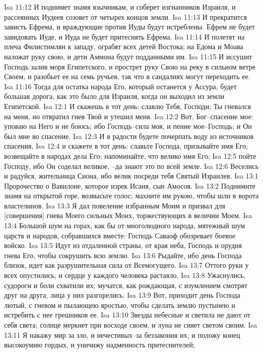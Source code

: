 Isa 11:12  И поднимет знамя язычникам, и соберет изгнанников Израиля, и рассеянных Иудеев созовет от четырех концов земли.
Isa 11:13  И прекратится зависть Ефрема, и враждующие против Иуды будут истреблены. Ефрем не будет завидовать Иуде, и Иуда не будет притеснять Ефрема.
Isa 11:14  И полетят на плеча Филистимлян к западу, ограбят всех детей Востока; на Едома и Моава наложат руку свою, и дети Аммона будут подданными им.
Isa 11:15  И иссушит Господь залив моря Египетского, и прострет руку Свою на реку в сильном ветре Своем, и разобьет ее на семь ручьев, так что в сандалиях могут переходить ее.
Isa 11:16  Тогда для остатка народа Его, который останется у Ассура, будет большая дорога, как это было для Израиля, когда он выходил из земли Египетской.
Isa 12:1  И скажешь в тот день: славлю Тебя, Господи; Ты гневался на меня, но отвратил гнев Твой и утешил меня.
Isa 12:2  Вот, Бог--спасение мое: уповаю на Него и не боюсь; ибо Господь--сила моя, и пение мое--Господь; и Он был мне во спасение.
Isa 12:3  И в радости будете почерпать воду из источников спасения,
Isa 12:4  и скажете в тот день: славьте Господа, призывайте имя Его; возвещайте в народах дела Его; напоминайте, что велико имя Его;
Isa 12:5  пойте Господу, ибо Он соделал великое, --да знают это по всей земле.
Isa 12:6  Веселись и радуйся, жительница Сиона, ибо велик посреди тебя Святый Израилев.
Isa 13:1  Пророчество о Вавилоне, которое изрек Исаия, сын Амосов.
Isa 13:2  Поднимите знамя на открытой горе, возвысьте голос; махните им рукою, чтобы шли в ворота властелинов.
Isa 13:3  Я дал повеление избранным Моим и призвал для [совершения] гнева Моего сильных Моих, торжествующих в величии Моем.
Isa 13:4  Большой шум на горах, как бы от многолюдного народа, мятежный шум царств и народов, собравшихся вместе: Господь Саваоф обозревает боевое войско.
Isa 13:5  Идут из отдаленной страны, от края неба, Господь и орудия гнева Его, чтобы сокрушить всю землю.
Isa 13:6  Рыдайте, ибо день Господа близок, идет как разрушительная сила от Всемогущего.
Isa 13:7  Оттого руки у всех опустились, и сердце у каждого человека растаяло.
Isa 13:8  Ужаснулись, судороги и боли схватили их; мучатся, как рождающая, с изумлением смотрят друг на друга, лица у них разгорелись.
Isa 13:9  Вот, приходит день Господа лютый, с гневом и пылающею яростью, чтобы сделать землю пустынею и истребить с нее грешников ее.
Isa 13:10  Звезды небесные и светила не дают от себя света; солнце меркнет при восходе своем, и луна не сияет светом своим.
Isa 13:11  Я накажу мир за зло, и нечестивых--за беззакония их, и положу конец высокоумию гордых, и уничижу надменность притеснителей;

